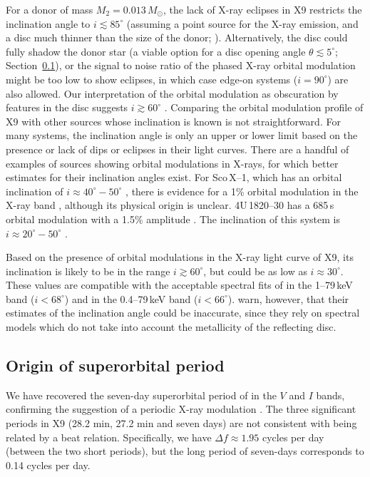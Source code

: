 \documentclass[a4paper,fleqn,usenatbib]{mnras}
\begin{document}
For a donor of mass $M_2 = 0.013\,M_{\odot}$, the lack of X-ray eclipses in X9 restricts the inclination angle to $i \lesssim 85^\circ$ (assuming a point source for the X-ray emission, and a disc much thinner than the size of the donor; \citealp{1987A&A...178..137F}). Alternatively, the disc could fully shadow the donor star (a viable option for a disc opening angle $\theta \lesssim 5^\circ$; Section~\ref{sec:sorb}), or the signal to noise ratio of the phased X-ray orbital modulation might be too low to show eclipses, in which case edge-on systems ($i = 90^\circ$) are also allowed. Our interpretation of the orbital modulation as obscuration by features in the disc suggests $i \gtrsim 60^\circ$ \citep{1987A&A...178..137F}. Comparing the orbital modulation profile of X9 with other sources whose inclination is known is not straightforward. For many systems, the inclination angle is only an upper or lower limit based on the presence or lack of dips or eclipses in their light curves. There are a handful of examples of sources showing orbital modulations in X-rays, for which better estimates for their inclination angles exist. For Sco\,X--1, which has an orbital inclination of $i \approx 40^\circ - 50^\circ$ \citep{2002ApJ...568..273S}, there is evidence for a 1\% orbital modulation in the X-ray band \citep{2003PASP..115..739V}, although its physical origin is unclear. 4U\,1820--30 has a 685\,s orbital modulation with a 1.5\% amplitude \citep{1987ApJ...312L..17S}. The inclination of this system is $i \approx 20^\circ - 50^\circ$ \citep{1997ApJ...482L..69A, 2004ApJ...602L.105B}.

Based on the presence of orbital modulations in the X-ray light curve of X9, its inclination is likely to be in the range $i \gtrsim 60^\circ$, but could be as low as $i \approx 30^\circ$. These values are compatible with the acceptable spectral fits of \citet{2017MNRAS.467.2199B} in the 1--79\,keV band ($i < 68^\circ$) and in the 0.4--79\,keV band ($i < 66^\circ$). \citet{2017MNRAS.467.2199B} warn, however, that their estimates of the inclination angle could be inaccurate, since they rely on spectral models which do not take into account the metallicity of the reflecting disc.

\subsection{Origin of superorbital period}
\label{sec:sorb}

We have recovered the seven-day superorbital period of \citet{2017MNRAS.467.2199B} in the $V$ and $I$ bands, confirming the suggestion of a periodic X-ray modulation \citep{2017MNRAS.467.2199B}. The three significant periods in X9 (28.2 min, 27.2 min and seven days) are not consistent with being related by a beat relation. Specifically, we have $\Delta f \approx 1.95$ cycles per day (between the two short periods), but the long period of seven-days corresponds to 0.14 cycles per day.
\end{document}
